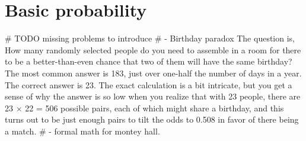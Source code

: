 \chapter{Basic probability}


# TODO missing problems to introduce
# - Birthday paradox The question is, How many randomly selected people do you need to assemble in a room for there to be a better-than-even chance that two of them will have the same birthday? The most common answer is 183, just over one-half the number of days in a year. The correct answer is 23. The exact calculation is a bit intricate, but you get a sense of why the answer is so low when you realize that with 23 people, there are 23 × 22 = 506 possible pairs, each of which might share a birthday, and this turns out to be just enough pairs to tilt the odds to 0.508 in favor of there being a match.
# - formal math for montey hall.


